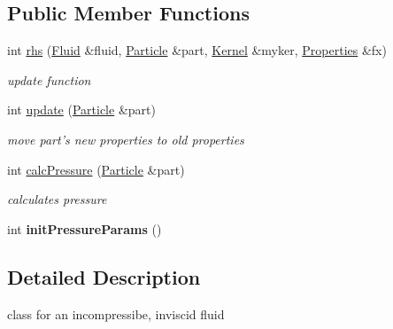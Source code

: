 \subsection*{\-Public \-Member \-Functions}
\begin{DoxyCompactItemize}
\item 
int \hyperlink{classIncompInvisc_a06fbd0a590ef1ef102352a094ae4c698}{rhs} (\hyperlink{classFluid}{\-Fluid} \&fluid, \hyperlink{classParticle}{\-Particle} \&part, \hyperlink{classKernel}{\-Kernel} \&myker, \hyperlink{structProperties}{\-Properties} \&fx)
\begin{DoxyCompactList}\small\item\em update function \end{DoxyCompactList}\item 
\hypertarget{classIncompInvisc_a06483b536f7464b593b55fe4d11a45ce}{int \hyperlink{classIncompInvisc_a06483b536f7464b593b55fe4d11a45ce}{update} (\hyperlink{classParticle}{\-Particle} \&part)}\label{classIncompInvisc_a06483b536f7464b593b55fe4d11a45ce}

\begin{DoxyCompactList}\small\item\em move part's new properties to old properties \end{DoxyCompactList}\item 
\hypertarget{classIncompInvisc_a4363561397ee2a76b67c23851fbaced5}{int \hyperlink{classIncompInvisc_a4363561397ee2a76b67c23851fbaced5}{calc\-Pressure} (\hyperlink{classParticle}{\-Particle} \&part)}\label{classIncompInvisc_a4363561397ee2a76b67c23851fbaced5}

\begin{DoxyCompactList}\small\item\em calculates pressure \end{DoxyCompactList}\item 
\hypertarget{classIncompInvisc_a51217aaa5b957cc843a7a81b59b82518}{int {\bfseries init\-Pressure\-Params} ()}\label{classIncompInvisc_a51217aaa5b957cc843a7a81b59b82518}

\end{DoxyCompactItemize}


\subsection{\-Detailed \-Description}
class for an incompressibe, inviscid fluid 

